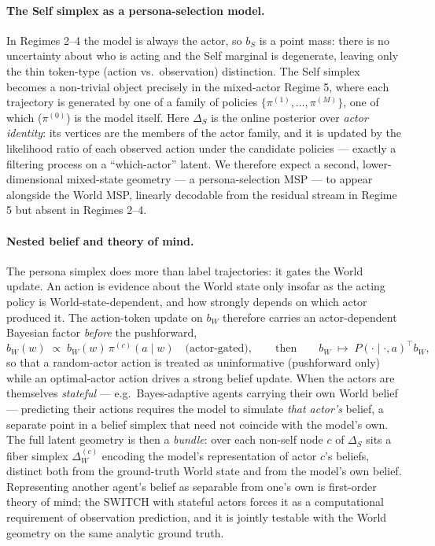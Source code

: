 \paragraph{The Self simplex as a persona-selection model.} In Regimes 2--4 the model is
always the actor, so $b_S$ is a point mass: there is no uncertainty about who is acting
and the Self marginal is degenerate, leaving only the thin token-type (action vs.\
observation) distinction. The Self simplex becomes a non-trivial object precisely in the
mixed-actor Regime 5, where each trajectory is generated by one of a family of policies
$\{\pi^{(1)},\dots,\pi^{(M)}\}$, one of which ($\pi^{(0)}$) is the model itself. Here
$\Delta_S$ is the online posterior over \emph{actor identity}: its vertices are the
members of the actor family, and it is updated by the likelihood ratio of each observed
action under the candidate policies --- exactly a filtering process on a ``which-actor''
latent. We therefore expect a second, lower-dimensional mixed-state geometry --- a
persona-selection MSP --- to appear alongside the World MSP, linearly decodable from the
residual stream in Regime 5 but absent in Regimes 2--4.

\paragraph{Nested belief and theory of mind.} The persona simplex does more than label
trajectories: it gates the World update. An action is evidence about the World state
only insofar as the acting policy is World-state-dependent, and how strongly depends on
which actor produced it. The action-token update on $b_W$ therefore carries an
actor-dependent Bayesian factor \emph{before} the pushforward,
\[
  b_W(w)\;\propto\; b_W(w)\,\pi^{(c)}(a\mid w)\quad\text{(actor-gated)},
  \qquad\text{then}\qquad
  b_W \;\mapsto\; P(\cdot\mid\cdot,a)^{\top} b_W,
\]
so that a random-actor action is treated as uninformative (pushforward only) while an
optimal-actor action drives a strong belief update. When the actors are themselves
\emph{stateful} --- e.g.\ Bayes-adaptive agents carrying their own World belief ---
predicting their actions requires the model to simulate \emph{that actor's} belief, a
separate point in a belief simplex that need not coincide with the model's own. The full
latent geometry is then a \emph{bundle}: over each non-self node $c$ of $\Delta_S$ sits a
fiber simplex $\Delta_W^{(c)}$ encoding the model's representation of actor $c$'s
beliefs, distinct both from the ground-truth World state and from the model's own
belief. Representing another agent's belief as separable from one's own is first-order
theory of mind; the SWITCH with stateful actors forces it as a computational requirement
of observation prediction, and it is jointly testable with the World geometry on the
same analytic ground truth.

